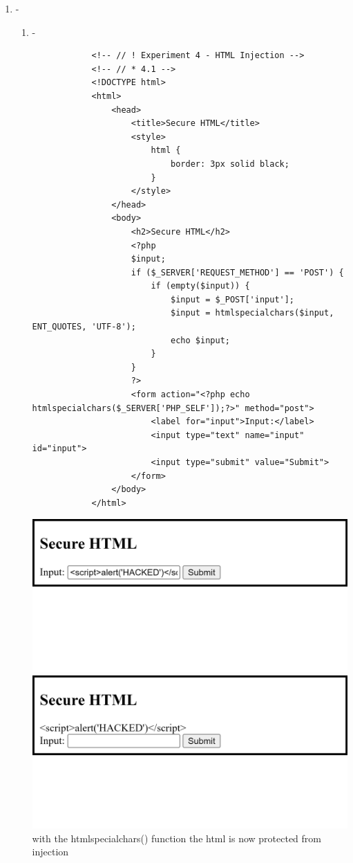 \documentclass[12pt,titlepage]{article}
\begin{document}
\begin{enumerate}
    \item -
    \begin{enumerate}
        \item -
        \begin{verbatim}
            <!-- // ! Experiment 4 - HTML Injection -->
            <!-- // * 4.1 -->
            <!DOCTYPE html>
            <html>
                <head>
                    <title>Secure HTML</title>
                    <style>
                        html {
                            border: 3px solid black;
                        }
                    </style>
                </head>
                <body>
                    <h2>Secure HTML</h2>
                    <?php
                    $input;
                    if ($_SERVER['REQUEST_METHOD'] == 'POST') {
                        if (empty($input)) {
                            $input = $_POST['input'];
                            $input = htmlspecialchars($input, ENT_QUOTES, 'UTF-8');
                            echo $input;
                        }
                    }
                    ?>
                    <form action="<?php echo htmlspecialchars($_SERVER['PHP_SELF']);?>" method="post">
                        <label for="input">Input:</label>
                        <input type="text" name="input" id="input">
                        <input type="submit" value="Submit">
                    </form>
                </body>
            </html>
        \end{verbatim}
        
        \newpage

        \includegraphics[width=.85\textwidth]{images/figures/fig4.1_a.png} \\ 
        \includegraphics[width=.85\textwidth]{images/figures/fig4.1_b.png} \\ 
        with the htmlspecialchars() function the html is now protected from injection
        

\end{enumerate}
\end{enumerate}
\end{document}
